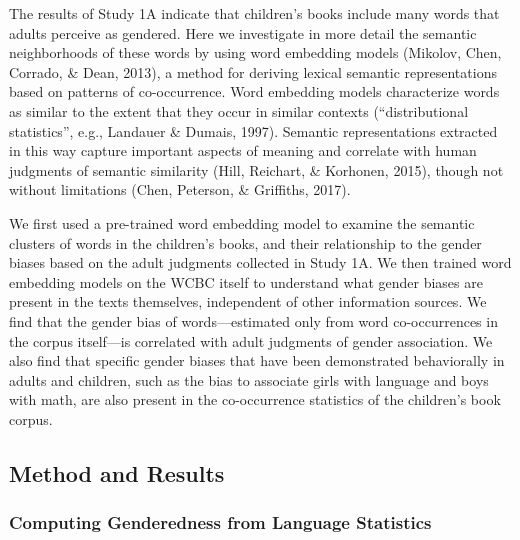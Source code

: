 \documentclass[english,,man,floatsintext]{apa6}
\begin{document}
The results of Study 1A indicate that children's books include many words that adults perceive as gendered. Here we investigate in more detail the semantic neighborhoods of these words by using word embedding models (Mikolov, Chen, Corrado, \& Dean, 2013), a method for deriving lexical semantic representations based on patterns of co-occurrence. Word embedding models characterize words as similar to the extent that they occur in similar contexts (``distributional statistics'', e.g., Landauer \& Dumais, 1997). Semantic representations extracted in this way capture important aspects of meaning and correlate with human judgments of semantic similarity (Hill, Reichart, \& Korhonen, 2015), though not without limitations (Chen, Peterson, \& Griffiths, 2017).

We first used a pre-trained word embedding model to examine the semantic clusters of words in the children's books, and their relationship to the gender biases based on the adult judgments collected in Study 1A. We then trained word embedding models on the WCBC itself to understand what gender biases are present in the texts themselves, independent of other information sources. We find that the gender bias of words---estimated only from word co-occurrences in the corpus itself---is correlated with adult judgments of gender association. We also find that specific gender biases that have been demonstrated behaviorally in adults and children, such as the bias to associate girls with language and boys with math, are also present in the co-occurrence statistics of the children's book corpus.

\hypertarget{method-and-results}{%
\subsection{Method and Results}\label{method-and-results}}

\hypertarget{computing-genderedness-from-language-statistics}{%
\subsubsection{Computing Genderedness from Language Statistics}\label{computing-genderedness-from-language-statistics}}
\end{document}
